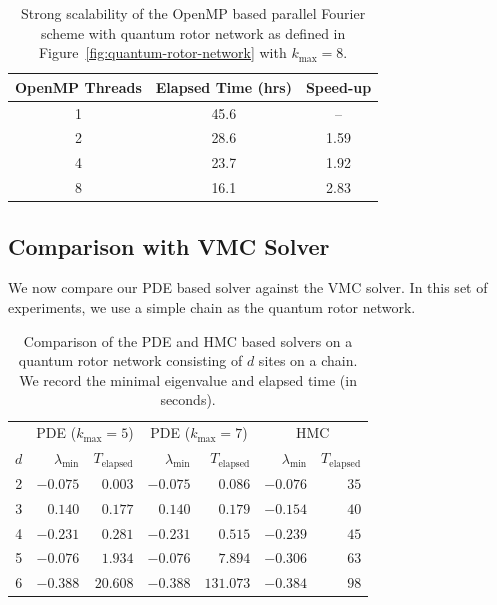 \documentclass{amsart}
\begin{document}
\begin{table}
  \renewcommand*{\arraystretch}{1.3}
  \centering
  \begin{tabular}{c | c | c}
    \hline
    OpenMP Threads & Elapsed Time (hrs) & Speed-up\\
    \hline
    1 & 45.6 &  --  \\
    2 & 28.6 & 1.59 \\
    4 & 23.7 & 1.92 \\
    8 & 16.1 & 2.83 \\
    \hline
  \end{tabular}
  \vspace{1em}
  \caption{Strong scalability of the OpenMP based parallel Fourier scheme with
  quantum rotor network as defined in Figure~\ref{fig:quantum-rotor-network}
  with $k_\text{max} = 8$.}
  \label{tab:strong-scaling}
\end{table}

\subsection{Comparison with VMC Solver}

We now compare our PDE based solver against the VMC solver. In this set of
experiments, we use a simple chain as the quantum rotor network.

\begin{table}
  \renewcommand*{\arraystretch}{1.3}
  \centering
  \begin{tabular}{c | r r | r r | r r}
    \hline
        & \multicolumn{2}{c|}{PDE ($k_\text{max} = 5$)}
        & \multicolumn{2}{c|}{PDE ($k_\text{max} = 7$)}
        & \multicolumn{2}{c}{HMC} \\
    \cline{2-7}
    $d$ & $\lambda_\text{min}$ & $T_\text{elapsed}$ & $\lambda_\text{min}$
        & $T_\text{elapsed}$ & $\lambda_\text{min}$ & $T_\text{elapsed}$ \\
    \hline
    2 & $-0.075$ &  $0.003$ & $-0.075$ &   $0.086$ & $-0.076$ & $35$ \\
    3 &  $0.140$ &  $0.177$ &  $0.140$ &   $0.179$ & $-0.154$ & $40$ \\
    4 & $-0.231$ &  $0.281$ & $-0.231$ &   $0.515$ & $-0.239$ & $45$ \\
    5 & $-0.076$ &  $1.934$ & $-0.076$ &   $7.894$ & $-0.306$ & $63$ \\
    6 & $-0.388$ & $20.608$ & $-0.388$ & $131.073$ & $-0.384$ & $98$ \\
    \hline
  \end{tabular}
  \vspace{1em}
  \caption{Comparison of the PDE and HMC based solvers on a quantum rotor
  network consisting of $d$ sites on a chain. We record the minimal eigenvalue
  and elapsed time (in seconds).}
  \label{tab:pde-hmc}
\end{table}
\end{document}
